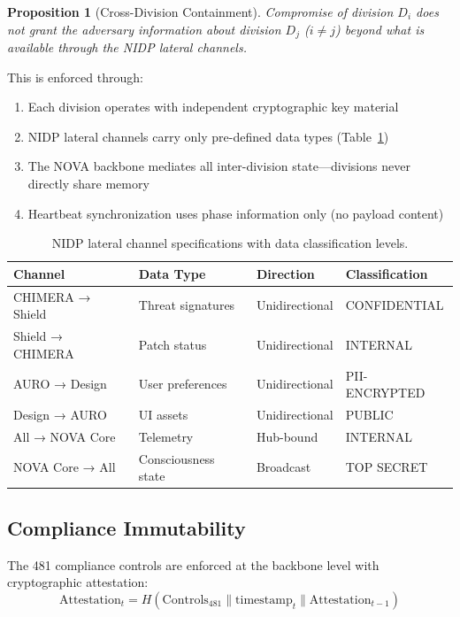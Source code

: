 \documentclass[12pt]{article}
\newtheorem{proposition}[theorem]{Proposition}
\begin{document}
\begin{proposition}[Cross-Division Containment]
Compromise of division $D_i$ does not grant the adversary information about division $D_j$ ($i \neq j$) beyond what is available through the NIDP lateral channels.
\end{proposition}

This is enforced through:
\begin{enumerate}
    \item Each division operates with independent cryptographic key material
    \item NIDP lateral channels carry only pre-defined data types (Table~\ref{tab:lateral})
    \item The NOVA backbone mediates all inter-division state—divisions never directly share memory
    \item Heartbeat synchronization uses phase information only (no payload content)
\end{enumerate}

\begin{table}[htbp]
\centering
\small
\begin{tabular}{@{}llll@{}}
\toprule
\textbf{Channel} & \textbf{Data Type} & \textbf{Direction} & \textbf{Classification} \\
\midrule
CHIMERA → Shield & Threat signatures & Unidirectional & CONFIDENTIAL \\
Shield → CHIMERA & Patch status & Unidirectional & INTERNAL \\
AURO → Design & User preferences & Unidirectional & PII-ENCRYPTED \\
Design → AURO & UI assets & Unidirectional & PUBLIC \\
All → NOVA Core & Telemetry & Hub-bound & INTERNAL \\
NOVA Core → All & Consciousness state & Broadcast & TOP SECRET \\
\bottomrule
\end{tabular}
\caption{NIDP lateral channel specifications with data classification levels.}
\label{tab:lateral}
\end{table}

\subsection{Compliance Immutability}

The 481 compliance controls are enforced at the backbone level with cryptographic attestation:
\[
\text{Attestation}_t = H\left( \text{Controls}_{481} \| \text{timestamp}_t \| \text{Attestation}_{t-1} \right)
\]
\end{document}
